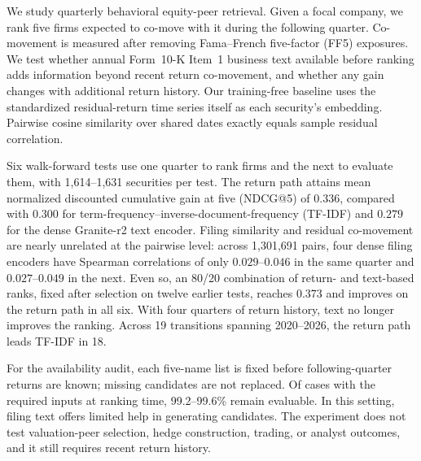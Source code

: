 We study quarterly behavioral equity-peer retrieval.  Given a focal company,
we rank five firms expected to co-move with it during the following quarter.
Co-movement is measured after removing Fama--French five-factor (FF5) exposures.
We test whether annual Form~10-K Item~1 business text available before ranking
adds information beyond recent return co-movement, and whether any gain changes
with additional return history.  Our training-free baseline uses the standardized
residual-return time series itself as each security's embedding.  Pairwise cosine
similarity over shared dates exactly equals sample residual correlation.

Six walk-forward tests use one quarter to rank firms and the next to evaluate them,
with 1,614--1,631 securities per test.  The return path attains mean normalized
discounted cumulative gain at five (NDCG@5) of $0.336$, compared with $0.300$
for term-frequency--inverse-document-frequency (TF-IDF) and $0.279$ for the
dense Granite-r2 text encoder.  Filing similarity and residual co-movement are
nearly unrelated at the pairwise level: across 1,301,691 pairs, four dense
filing encoders have Spearman correlations of only $0.029$--$0.046$ in the same
quarter and $0.027$--$0.049$ in the next.  Even so, an
80/20 combination of return- and text-based ranks, fixed after selection on
twelve earlier tests, reaches $0.373$ and
improves on the return path in all six.  With four quarters of return history, text no longer improves the
ranking.  Across 19
transitions spanning 2020--2026, the return path leads TF-IDF in 18.

For the availability audit, each five-name list is fixed before following-quarter
returns are known; missing candidates are not replaced.  Of cases with the
required inputs at ranking time, 99.2--99.6\% remain evaluable.  In this
setting, filing text offers limited help in generating candidates.  The
experiment does not test valuation-peer selection, hedge construction, trading,
or analyst outcomes, and it still requires recent return history.
